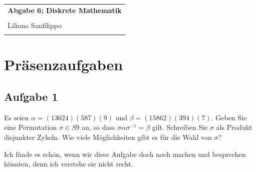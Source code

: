 \documentclass{article} %
\newcommand{\titulo}{Abgabe 6; Diskrete Mathematik}
\newcommand{\nombre}{Liliana Sanfilippo}
\begin{document}
\begin{tabular}{p{12cm}}
{{\Large\bf\titulo}}\\
\vspace{0.2cm}\\
 {\large\nombre}\\
 \vspace{0.2cm}\\   
\end{tabular}
\section*{Präsenzaufgaben}
\subsection*{Aufgabe 1}
Es seien $\alpha = (13624)(587)(9)$ und $\beta = (15862)(394)(7)$. Geben Sie eine Permutation
$\sigma \in S9$ an, so dass $\sigma\alpha\sigma^{-1} = \beta$ gilt. Schreiben Sie $\sigma$ als Produkt disjunkter Zykeln. Wie
viele Möglichkeiten gibt es für die Wahl von $\sigma$?
\begin{mybox}
Ich fände es schön, wenn wir diese Aufgabe doch noch machen und besprechen könnten, denn ich verstehe sie nicht recht. 
\end{mybox}
\end{document}
